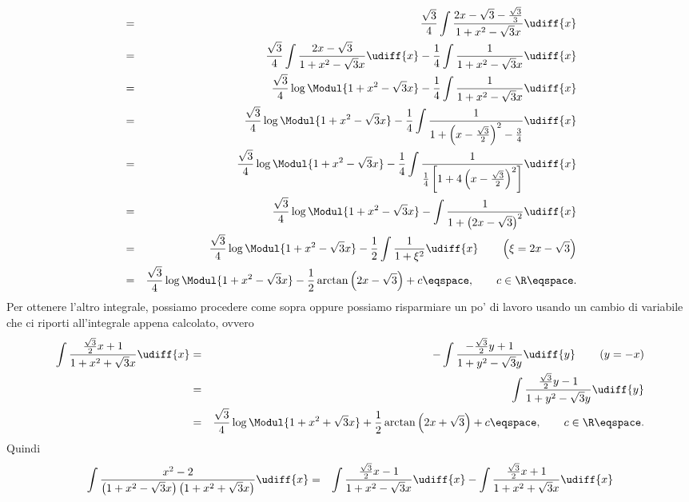 \begin{Solution}
\begin{eqnarray*}
&=& \frac{\sqrt{3}}{4} \int \frac{ 2x - \sqrt{3} - \frac{\sqrt{3}}{3} }{1 +
x^{2} - \sqrt{3} x } \udiff{x} \\
&=& \frac{\sqrt{3}}{4} \int \frac{ 2 x - \sqrt{3}}{1+x^{2} - \sqrt{3} x }
\udiff{x} - \frac{1}{4} \int \frac{1}{1+x^{2} - \sqrt{3} x } \udiff{x} \\
&=& \frac{\sqrt{3}}{4} \log \Modul{ 1 + x^{2} - \sqrt{3} x } - \frac{1}{4} \int
\frac{1}{1+x^{2} - \sqrt{3} x } \udiff{x} \\
&=& \frac{\sqrt{3}}{4} \log \Modul{ 1 + x^{2} - \sqrt{3} x } - \frac{1}{4} \int
\frac{1}{1+\left( x - \frac{\sqrt{3}}{2} \right)^{2}  - \frac{3}{4}  } \udiff{x} \\
&=& \frac{\sqrt{3}}{4} \log \Modul{ 1 + x^{2} - \sqrt{3} x } - \frac{1}{4} \int
\frac{1}{\frac{1}{4} \left[ 1 + 4 \left( x - \frac{\sqrt{3}}{2} \right)^{2}
\right]} \udiff{x} \\
&=& \frac{\sqrt{3}}{4} \log \Modul{ 1 + x^{2} - \sqrt{3} x } - \int
\frac{1}{1 + \left( 2x - \sqrt{3} \right)^{2}} \udiff{x}  \\
&=& \frac{\sqrt{3}}{4} \log \Modul{ 1 + x^{2} - \sqrt{3} x } - \frac{1}{2} \int
\frac{1}{1 + \xi^{2}} \udiff{x}  \qquad \left( \xi = 2x - \sqrt{3} \right)\\
&=& \frac{\sqrt{3}}{4} \log \Modul{ 1 + x^{2} - \sqrt{3} x } - \frac{1}{2} 
\arctan \left( 2 x - \sqrt{3} \right) + c \eqspace, \qquad c \in \R \eqspace .
\end{eqnarray*}
Per ottenere l'altro integrale, possiamo procedere come sopra oppure possiamo
risparmiare un po' di lavoro usando un cambio di variabile che ci riporti
all'integrale appena calcolato, ovvero
\begin{eqnarray*}
\int \frac{ \frac{\sqrt{3}}{2} x +1}{1 +x^{2} + \sqrt{3} x } \udiff{x} &=& -
\int \frac{ -\frac{\sqrt{3}}{2} y +1}{1+y^{2} - \sqrt{3} y } \udiff{y} \qquad
\left( y = -x \right) \\
&=& \int \frac{ \frac{\sqrt{3}}{2} y - 1}{1+y^{2} - \sqrt{3} y } \udiff{y} \\
&=& \frac{\sqrt{3}}{4} \log \Modul{1+ x^{2} + \sqrt{3} x } + \frac{1}{2} \arctan
\left( 2 x+ \sqrt{3} \right) +c \eqspace , \qquad c \in \R \eqspace .
\end{eqnarray*}
Quindi
\begin{eqnarray*}
\int 
\frac{x^{2} -2}{\left( 1 + x^{2} - \sqrt{3} x \right)\left( 1+x^{2} +
\sqrt{3} x \right)}  \udiff{x} &=&
\int 
\frac{\frac{\sqrt{3}}{2} x -1 }{1+x^{2} - \sqrt{3} x } \udiff{x} - \int
\frac{\frac{\sqrt{3}}{2} x +1}{1 +
x^{2} + \sqrt{3} x }  \udiff{x} \\

\end{eqnarray*}
\end{Solution}

